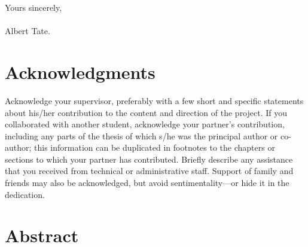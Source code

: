 \documentclass[12pt,openany,a4paper]{book}
\begin{document}
\begin{flushright}
	Yours sincerely,\\
	\medskip
	\makebox[1.0in]{\hrulefill}\\
	\medskip
	Albert Tate.
\end{flushright}

\cleardoublepage

\chapter{Acknowledgments}

Acknowledge your supervisor, preferably with a few short and specific
statements about his/her contribution to the content and direction of
the project.  If you collaborated with another student, acknowledge
your partner's contribution, including any parts of the thesis of
which s/he was the principal author or co-author; this information can
be duplicated in footnotes to the chapters or sections to which your
partner has contributed.  Briefly describe any assistance that you
received from technical or administrative staff.  Support of family
and friends may also be acknowledged, but avoid sentimentality---or
hide it in the dedication.

\cleardoublepage

\chapter{Abstract}

\end{document}
